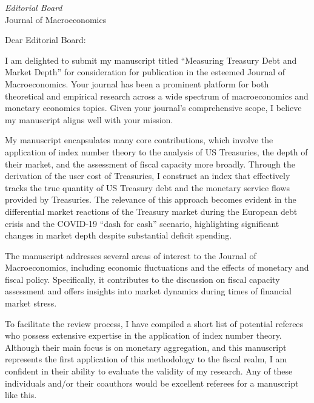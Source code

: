 \documentclass[foldmarks=false, backaddress=off,fromemail,firstfoot=true,12pt]{scrlttr2}
\date{\today}
\begin{document}


\begin{letter}{{\it Editorial Board} \\ Journal of Macroeconomics}
\opening{Dear Editorial Board:}

I am delighted to submit my manuscript titled ``Measuring Treasury Debt and Market Depth'' for consideration for publication in the esteemed Journal of Macroeconomics. Your journal has been a prominent platform for both theoretical and empirical research across a wide spectrum of macroeconomics and monetary economics topics. Given your journal's comprehensive scope, I believe my manuscript aligns well with your mission.

My manuscript encapsulates many core contributions, which involve the application of index number theory to the analysis of US Treasuries, the depth of their market, and the assessment of fiscal capacity more broadly. 
Through the derivation of the user cost of Treasuries, I construct an index that effectively tracks the true quantity of US Treasury debt and the monetary service flows provided by Treasuries. 
The relevance of this approach becomes evident in the differential market reactions of the Treasury market during the European debt crisis and the COVID-19 ``dash for cash'' scenario, highlighting significant changes in market depth despite substantial deficit spending.

The manuscript addresses several areas of interest to the Journal of Macroeconomics, including economic fluctuations and the effects of monetary and fiscal policy. 
Specifically, it contributes to the discussion on fiscal capacity assessment and offers insights into market dynamics during times of financial market stress.

To facilitate the review process, I have compiled a short list of potential referees who possess extensive expertise in the application of index number theory. 
Although their main focus is on monetary aggregation, and this manuscript represents the first application of this methodology to the fiscal realm, I am confident in their ability to evaluate the validity of my research.
Any of these individuals and/or their coauthors would be excellent referees for a manuscript like this.


\end{letter}
\end{document}
